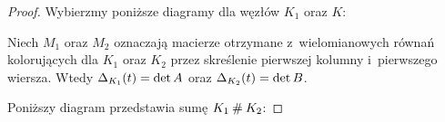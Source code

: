 \begin{proof}
    Wybierzmy poniższe diagramy dla węzłów $K_1$ oraz $K$:
\begin{comment}
    \[\begin{tikzpicture}[baseline=-0.65ex, scale=0.07]
    \begin{knot}[clip width=7, end tolerance=1pt]
        \strand[thick] (-70, -20) rectangle (-30, 20);
        \strand[thick] (30, -20) rectangle ( 70, 20);
        \strand[thick] (-10, -10) [in=right, out=left] to (-25, 10);
        \strand[thick,-latex] (-25, 10) to (-30, 10);
        \strand[thick] (-30,-10) [in=left, out=right] to (-25, -10) to (-10, 10);
        \strand[thick] (-10, 10) [in=up, out=right] to (-5, 0) [in=right, out=down] to (-10, -10);

        \strand[thick] (30, 10) [in=right, out=left] to (25, 10) to (10, -10);
        \strand[thick,latex-] (30, -10) [in=right, out=left] to (25, -10) to (10, 10);
        \strand[thick] (10, 10) [in=up, out=left] to (5, 0) [in=left, out=down] to (10, -10);

        \node[darkblue] at (-50,10) [below] {$x_1,\ldots,x_{m-1}$};
        \node[red] at (-50,-10) [above] {$1,\ldots,m$};

        \node[darkblue] at (50,10) [below] {$y_1,\ldots,y_{n-1}$};
        \node[red] at (50,-10) [above] {$1,\ldots,n$};

        \node[darkblue] at (-20,-10)[below] {$x_m$};
        \node[darkblue] at (-10, 10)[above] {$x_0$};
        \node[darkblue] at (25,-10)[below] {$y_n$};
        \node[darkblue] at (10,10)[above] {$y_0$};
        \node[red] at ( 20,  0)[right]{$0$};
        \node[red] at (-20,  0)[left]{$0$};
    \end{knot}
    \end{tikzpicture}\]
\end{comment}
    Niech $M_1$ oraz $M_2$ oznaczają macierze otrzymane z~wielomianowych równań kolorujących dla $K_1$ oraz $K_2$ przez skreślenie pierwszej kolumny i~pierwszego wiersza.
    Wtedy $\Delta_{K_1}(t) = \det A$ oraz $\Delta_{K_2}(t) = \det B$.
    
    Poniższy diagram przedstawia sumę $K_1 \mathbin{\#} K_2$:
\begin{comment}
    \[\begin{tikzpicture}[baseline=-0.65ex, scale=0.07]
        \begin{knot}[clip width=5, end tolerance=1pt]
            \strand[thick] (-70, -20) rectangle (-30, 20);
            \strand[thick] (30, -20) rectangle ( 70, 20);
            \strand[thick] (-10, -10) [in=right, out=left] to (-25, 10);
            \strand[thick,-latex] (-25, 10) to (-30, 10);
            \strand[thick] (-30,-10) [in=left, out=right] to (-25, -10) to (-10, 10);
            \strand[thick] (-10, -10) to (10, -10);
            \strand[thick] (-10, 10) to (10, 10);


\end{comment}
\end{proof}
